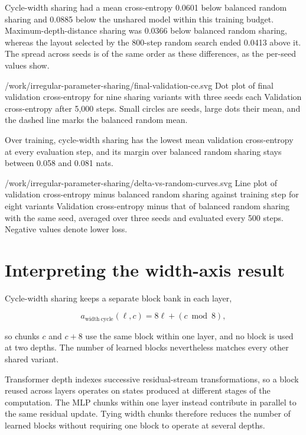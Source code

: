 \documentclass[11pt]{article}
\begin{document}
Cycle-width sharing had a mean cross-entropy 0.0601 below balanced random sharing and 0.0885 below the unshared model within this training budget. Maximum-depth-distance sharing was 0.0366 below balanced random sharing, whereas the layout selected by the 800-step random search ended 0.0413 above it. The spread across seeds is of the same order as these differences, as the per-seed values show.

  {/work/irregular-parameter-sharing/final-validation-ce.svg}
  {Dot plot of final validation cross-entropy for nine sharing variants with three seeds each}
  {Validation cross-entropy after 5,000 steps. Small circles are seeds, large dots their mean, and the dashed line marks the balanced random mean.}

Over training, cycle-width sharing has the lowest mean validation cross-entropy at every evaluation step, and its margin over balanced random sharing stays between 0.058 and 0.081 nats.

  {/work/irregular-parameter-sharing/delta-vs-random-curves.svg}
  {Line plot of validation cross-entropy minus balanced random sharing against training step for eight variants}
  {Validation cross-entropy minus that of balanced random sharing with the same seed, averaged over three seeds and evaluated every 500 steps. Negative values denote lower loss.}

\section{Interpreting the width-axis result}\label{why-width}

Cycle-width sharing keeps a separate block bank in each layer,

\[
a_{\mathrm{width\ cycle}}(\ell,c)=8\ell+(c\bmod 8),
\]

so chunks \(c\) and \(c+8\) use the same block within one layer, and no block is used at two depths. The number of learned blocks nevertheless matches every other shared variant.

Transformer depth indexes successive residual-stream transformations, so a block reused across layers operates on states produced at different stages of the computation. The MLP chunks within one layer instead contribute in parallel to the same residual update. Tying width chunks therefore reduces the number of learned blocks without requiring one block to operate at several depths.
\end{document}
